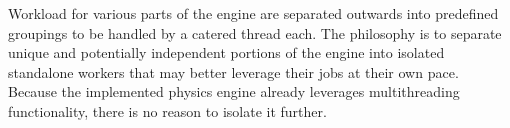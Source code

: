 Workload for various parts of the engine are separated outwards into predefined groupings to be handled by a catered thread each. The philosophy is to separate unique and potentially independent portions of the engine into isolated standalone workers that may better leverage their jobs at their own pace. Because the implemented physics engine already leverages multithreading functionality, there is no reason to isolate it further.